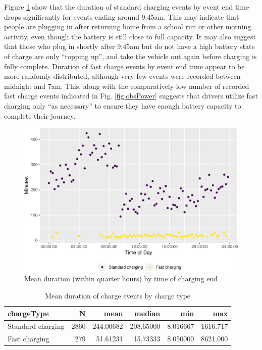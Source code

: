 \documentclass[]{article}
\begin{document}
Figure \ref{fig:durationTimeMean} show that the duration of standard
charging events by event end time drops significantly for events ending
around 9:45am. This may indicate that people are plugging in after
returning home from a school run or other morning activity, even though
the battery is still close to full capacity. It may also suggest that
those who plug in shortly after 9:45am but do not have a high battery
state of charge are only ``topping up'', and take the vehicle out again
before charging is fully complete. Duration of fast charge events by
event end time appear to be more randomly distributed, although very few
events were recorded between midnight and 7am. This, along with the
comparatively low number of recorded fast charge events indicated in
Fig. \ref{fig:obsPower} suggests that drivers utilize fast charging only
``as necessary'' to ensure they have enough battery capacity to complete
their journey.

\begin{figure}
\centering
\includegraphics{EVBB_report_files/figure-latex/durationTimeMean-1.pdf}
\caption{\label{fig:durationTimeMean}Mean duration (within quarter hours) by
time of charging end}
\end{figure}

\begin{table}[t]

\caption{\label{tab:meanDurationTable}Mean duration of charge events by charge type}
\centering
\begin{tabular}{l|r|r|r|r|r}
\hline
chargeType & N & mean & median & min & max\\
\hline
Standard charging & 2860 & 244.00682 & 208.65000 & 8.016667 & 1616.717\\
\hline
Fast charging & 279 & 51.61231 & 15.73333 & 8.050000 & 8621.000\\
\hline
\end{tabular}
\end{table}
\end{document}
